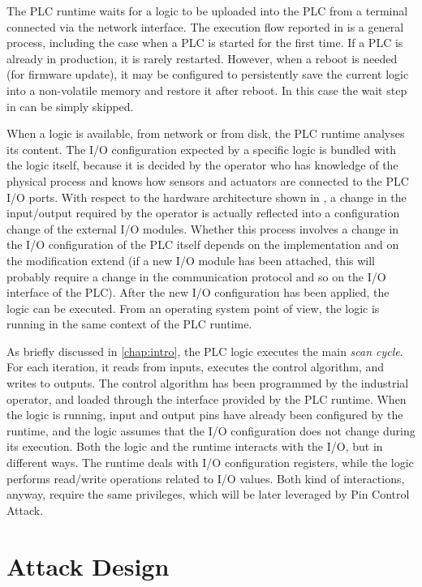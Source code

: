 The PLC runtime waits for a logic to be uploaded into the PLC from a terminal connected via the network interface.
The execution flow reported in \myfig{\ref{fig:plc_swarch}} is a general process, including the case when a PLC is started for the first time.
If a PLC is already in production, it is rarely restarted. However, when a reboot is needed (\eg for firmware update),
it may be configured to persistently save the current logic into a non-volatile memory and restore it after reboot.
In this case the wait step in \myfig{\ref{fig:plc_swarch}} can be simply skipped.

When a logic is available, from network or from disk, the PLC runtime analyses its content.
The I/O configuration expected by a specific logic is bundled with the logic itself, because it is decided by the operator who has knowledge of the physical process
and knows how sensors and actuators are connected to the PLC I/O ports. With respect to the hardware architecture shown in \myfig{\ref{fig:plc_arch}},
a change in the input/output required by the operator is actually reflected into a configuration change of the external I/O modules.
Whether this process involves a change in the I/O configuration of the PLC itself depends on the implementation and on the modification extend
(\eg if a new I/O module has been attached, this will probably require a change in the communication protocol and so on the I/O interface of the PLC).
After the new I/O configuration has been applied, the logic can be executed. From an operating system point of view, the logic is running in the same context of the PLC runtime.

As briefly discussed in \chap \ref{chap:intro}, the PLC logic executes the main \emph{scan cycle}. For each iteration, it reads from inputs, executes the control algorithm,
and writes to outputs. The control algorithm has been programmed by the industrial operator, and loaded through the interface provided by the PLC runtime.
When the logic is running, input and output pins have already been configured by the runtime, and the logic assumes that the I/O configuration does not change during its execution.
Both the logic and the runtime interacts with the I/O, but in different ways. The runtime deals with I/O configuration registers, while the logic performs read/write operations
related to I/O values. Both kind of interactions, anyway, require the same privileges, which will be later leveraged by Pin Control Attack.


\section{Attack Design}

